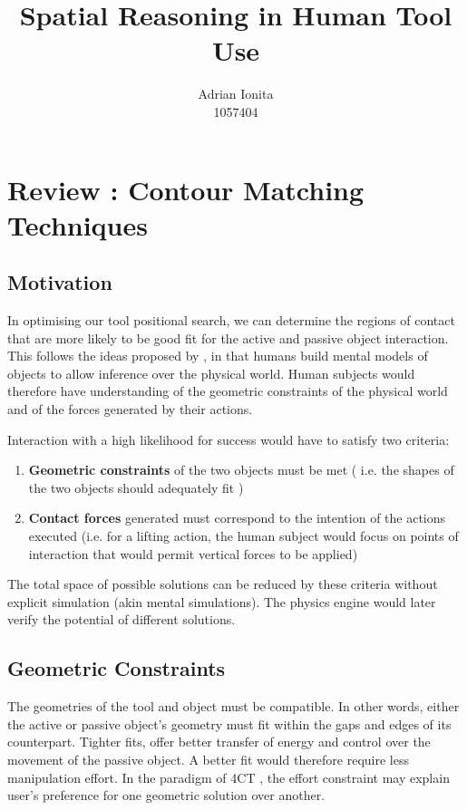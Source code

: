 \documentclass[
    a4paper,
    man,
    floatsintext,
    british
]{apa6}
\title{Spatial Reasoning in Human Tool Use}
\author{Adrian Ionita\\
1057404}
\affiliation{University Of Birmingham\\
2016\\
}
\begin{document}
\thispagestyle{otherpage}
\maketitle

\section{Review : Contour Matching Techniques}

\subsection{Motivation}
In optimising our tool positional search, we can determine the regions of contact that are more likely to be good fit for the active and passive object interaction. This follows the ideas proposed by \cite{battaglia2013}, in that humans build mental models of objects to allow inference over  the physical world. Human subjects would therefore have understanding of the geometric constraints of the physical world and of the forces generated by their actions.

Interaction with a high likelihood for success would have to satisfy two criteria: 
\begin{enumerate}
\item \textbf{Geometric constraints} of the two objects must be met ( i.e. the shapes of the two objects should adequately fit )
\item \textbf{Contact forces} generated must correspond to the intention of the actions executed (i.e. for a lifting action, the human subject would focus on points of interaction that would permit vertical forces to be applied)
\end{enumerate}

The total space of possible solutions can be reduced by these criteria without explicit simulation (akin mental simulations\cite{osiurak2014}). The physics engine would later verify the potential of different solutions. 

\subsection{Geometric Constraints}
The geometries of the tool and object must be compatible. In other words, either the active or passive object's geometry must fit within the gaps and edges of its counterpart. Tighter fits, offer better transfer of energy and control over the movement of the passive object. A better fit would therefore require less manipulation effort. In the paradigm of 4CT \cite{osiurak2014}, the effort constraint may explain user's preference for one geometric solution over another.
\end{document}
